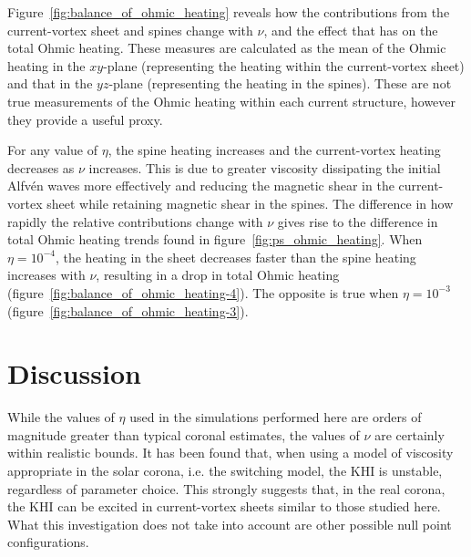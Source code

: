 Figure~\ref{fig:balance_of_ohmic_heating} reveals how the contributions from the current-vortex sheet and spines change with $\nu$, and the effect that has on the total Ohmic heating. These measures are calculated as the mean of the Ohmic heating in the $xy$-plane (representing the heating within the current-vortex sheet) and that in the $yz$-plane (representing the heating in the spines). These are not true measurements of the Ohmic heating within each current structure, however they provide a useful proxy. 

For any value of $\eta$, the spine heating increases and the current-vortex heating decreases as $\nu$ increases. This is due to greater viscosity dissipating the initial Alfv\'en waves more effectively and reducing the magnetic shear in the current-vortex sheet while retaining magnetic shear in the spines. The difference in how rapidly the relative contributions change with $\nu$ gives rise to the difference in total Ohmic heating trends found in figure~\ref{fig:ps_ohmic_heating}. When $\eta=10^{-4}$, the heating in the sheet decreases faster than the spine heating increases with $\nu$, resulting in a drop in total Ohmic heating (figure~\ref{fig:balance_of_ohmic_heating-4}). The opposite is true when $\eta=10^{-3}$ (figure~\ref{fig:balance_of_ohmic_heating-3}).

\section{Discussion}
\label{sec:khi_discussion}

While the values of $\eta$ used in the simulations performed here are orders of magnitude greater than typical coronal estimates, the values of $\nu$ are certainly within realistic bounds. It has been found that, when using a model of viscosity appropriate in the solar corona, i.e. the switching model, the KHI is unstable, regardless of parameter choice. This strongly suggests that, in the real corona, the KHI can be excited in current-vortex sheets similar to those studied here. What this investigation does not take into account are other possible null point configurations.

